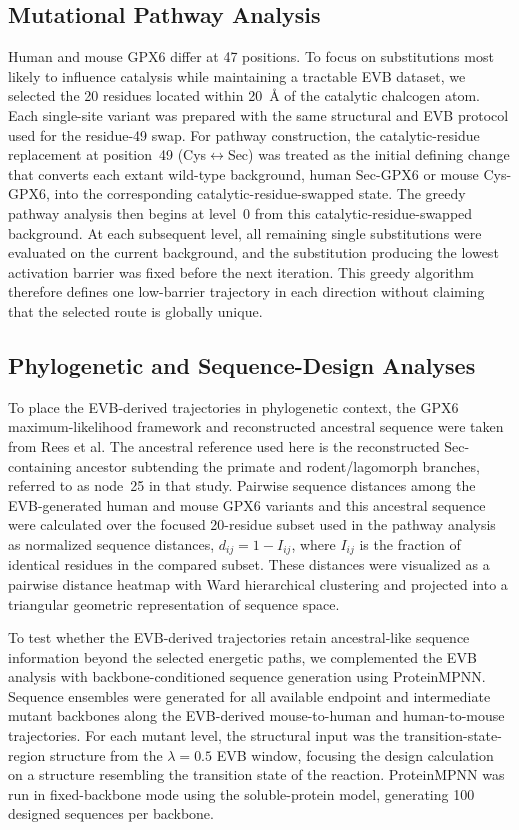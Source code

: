 \subsection{Mutational Pathway Analysis}

Human and mouse GPX6 differ at 47 positions. To focus on substitutions most likely to influence catalysis while maintaining a tractable EVB dataset, we selected the 20 residues located within 20~\AA{} of the catalytic chalcogen atom. Each single-site variant was prepared with the same structural and EVB protocol used for the residue-49 swap. For pathway construction, the catalytic-residue replacement at position~49 (Cys$\leftrightarrow$Sec) was treated as the initial defining change that converts each extant wild-type background, human Sec-GPX6 or mouse Cys-GPX6, into the corresponding catalytic-residue-swapped state. The greedy pathway analysis then begins at level~0 from this catalytic-residue-swapped background. At each subsequent level, all remaining single substitutions were evaluated on the current background, and the substitution producing the lowest activation barrier was fixed before the next iteration. This greedy algorithm therefore defines one low-barrier trajectory in each direction without claiming that the selected route is globally unique.

\subsection{Phylogenetic and Sequence-Design Analyses}

To place the EVB-derived trajectories in phylogenetic context, the GPX6 maximum-likelihood framework and reconstructed ancestral sequence were taken from Rees et al.\cite{rees_ancient_2024} The ancestral reference used here is the reconstructed Sec-containing ancestor subtending the primate and rodent/lagomorph branches, referred to as node~25 in that study. Pairwise sequence distances among the EVB-generated human and mouse GPX6 variants and this ancestral sequence were calculated over the focused 20-residue subset used in the pathway analysis as normalized sequence distances, $d_{ij}=1-I_{ij}$, where $I_{ij}$ is the fraction of identical residues in the compared subset. These distances were visualized as a pairwise distance heatmap with Ward hierarchical clustering and projected into a triangular geometric representation of sequence space.

To test whether the EVB-derived trajectories retain ancestral-like sequence information beyond the selected energetic paths, we complemented the EVB analysis with backbone-conditioned sequence generation using ProteinMPNN.\cite{Dauparas2022ProteinMPNN} Sequence ensembles were generated for all available endpoint and intermediate mutant backbones along the EVB-derived mouse-to-human and human-to-mouse trajectories. For each mutant level, the structural input was the transition-state-region structure from the $\lambda=0.5$ EVB window, focusing the design calculation on a structure resembling the transition state of the reaction. ProteinMPNN was run in fixed-backbone mode using the soluble-protein model, generating 100 designed sequences per backbone.

